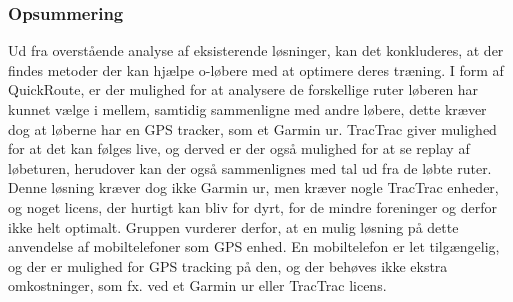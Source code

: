 \subsubsection{Opsummering}
Ud fra overstående analyse af eksisterende løsninger, kan det konkluderes, at der findes metoder der kan hjælpe o-løbere med at optimere deres træning. I form af QuickRoute, er der mulighed for at analysere de forskellige ruter løberen har kunnet vælge i mellem, samtidig sammenligne med andre løbere, dette kræver dog at løberne har en GPS tracker, som et Garmin ur. TracTrac giver mulighed for at det kan følges live, og derved er der også mulighed for at se replay af løbeturen, herudover kan der også sammenlignes med tal ud fra de løbte ruter. Denne løsning kræver dog ikke Garmin ur, men kræver nogle TracTrac enheder, og noget licens, der hurtigt kan bliv for dyrt, for de mindre foreninger og derfor ikke helt optimalt. 
Gruppen vurderer derfor, at en mulig løsning på dette anvendelse af mobiltelefoner som GPS enhed. En mobiltelefon er let tilgængelig, og der er mulighed for GPS tracking på den, og der behøves ikke ekstra omkostninger, som fx. ved et Garmin ur eller TracTrac licens.

